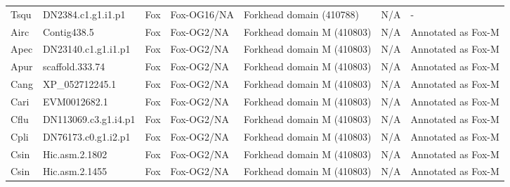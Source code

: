 \documentclass[../main.tex]{subfiles}
\begin{document}
\begin{landscape}
\begin{longtable}{lllllll}
		Tsqu           & DN2384.c1.g1.i1.p1    & Fox            & Fox-OG16/NA         & Forkhead domain (410788)                    & N/A                                                                    & -                    \\
		Airc           & Contig438.5           & Fox            & Fox-OG2/NA          & Forkhead domain M (410803)                  & N/A                                                                    & Annotated as Fox-M   \\
		Apec           & DN23140.c1.g1.i1.p1   & Fox            & Fox-OG2/NA          & Forkhead domain M (410803)                  & N/A                                                                    & Annotated as Fox-M   \\
		Apur           & scaffold.333.74       & Fox            & Fox-OG2/NA          & Forkhead domain M (410803)                  & N/A                                                                    & Annotated as Fox-M   \\
		Cang           & XP\_052712245.1       & Fox            & Fox-OG2/NA          & Forkhead domain M (410803)                  & N/A                                                                    & Annotated as Fox-M   \\
		Cari           & EVM0012682.1          & Fox            & Fox-OG2/NA          & Forkhead domain M (410803)                  & N/A                                                                    & Annotated as Fox-M   \\
		Cflu           & DN113069.c3.g1.i4.p1  & Fox            & Fox-OG2/NA          & Forkhead domain M (410803)                  & N/A                                                                    & Annotated as Fox-M   \\
		Cpli           & DN76173.c0.g1.i2.p1   & Fox            & Fox-OG2/NA          & Forkhead domain M (410803)                  & N/A                                                                    & Annotated as Fox-M   \\
		Csin           & Hic.asm.2.1802        & Fox            & Fox-OG2/NA          & Forkhead domain M (410803)                  & N/A                                                                    & Annotated as Fox-M   \\
		Csin           & Hic.asm.2.1455        & Fox            & Fox-OG2/NA          & Forkhead domain M (410803)                  & N/A                                                                    & Annotated as Fox-M   \\

\end{longtable}
\end{landscape}
\end{document}

